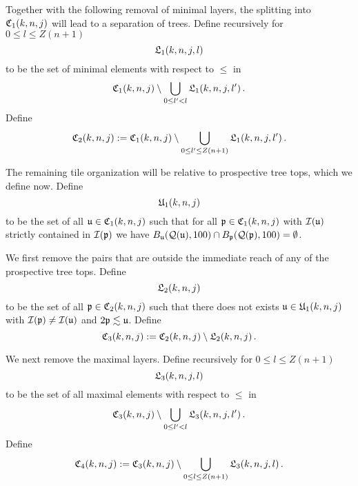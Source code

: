 {\begin{equation}
\end{equation}
Together with the following removal of minimal layers, the splitting into $\mathfrak C_1(k,n,j)$ will lead to a separation of  trees.
Define recursively for $0\le l\le Z(n+1)$
\begin{equation}
    \label{eq L1 def}
    \mathfrak L_1(k,n,j,l)
\end{equation}
to be the set of minimal elements with respect to $\le$ in
\begin{equation}
    \mathfrak C_1(k,n,j)\setminus \bigcup_{0\le l'<l}
\mathfrak L_1(k,n,j,l')\, .
\end{equation}
Define
\begin{equation}
    \label{eq C2 def}
    \mathfrak C_2(k,n,j):= \mathfrak C_1(k,n,j)\setminus \bigcup_{0\le l'\le Z(n+1)}
\mathfrak L_1(k,n,j,l')\, .
\end{equation}

The remaining tile organization will be relative to
prospective tree tops, which we define now.
Define
\begin{equation}\label{defunkj}
     \mathfrak U_1(k,n,j)
\end{equation}
to be the set of all
$\mathfrak u \in \mathfrak C_1(k,n,j)$ such that
for all $\mathfrak p \in \mathfrak C_1(k,n,j)$
with  $\mathcal{I}(\mathfrak u)$ strictly contained in
$\mathcal{I}(\mathfrak p)$ we have $B_{\mathfrak u}(\mathcal{Q}(\mathfrak u), 100) \cap B_{\mathfrak p}(\mathcal{Q}(\mathfrak p),100) = \emptyset$.

We first remove the pairs that are outside the immediate reach of any of the prospective tree tops.
Define
\begin{equation}
\label{eq L2 def}
\mathfrak L_2(k,n,j)
\end{equation}
to be the set of all $\mathfrak p\in \mathfrak C_2(k,n,j)$ such that there
does not exists
$\mathfrak u\in \mathfrak U_1(k,n,j)$
with $\mathcal{I}(\mathfrak p)\neq \mathcal{I}(\mathfrak u)$ and $2\mathfrak p\lesssim \mathfrak u$.
Define
\begin{equation}
\label{eq C3 def}
\mathfrak C_3(k,n,j):=\mathfrak C_2(k,n,j)
  \setminus \mathfrak L_2(k,n,j)\, .
\end{equation}


We next remove the maximal layers.
Define recursively for $0 \le l \le Z(n+1)$
\begin{equation}
    \label{eq L3 def}
    \mathfrak L_3(k,n,j,l)
\end{equation}
to be the set of all maximal elements with respect to $\le$ in
\begin{equation}
    \mathfrak C_3(k,n,j) \setminus \bigcup_{0 \le l' < l} \mathfrak L_3(k,n,j,l')\,.
\end{equation}
Define
\begin{equation}
\label{eq C4 def}
\mathfrak C_4(k,n,j):=\mathfrak C_3(k,n,j)
  \setminus \bigcup_{0 \le l \le Z(n+1)} \mathfrak L_3(k,n,j,l)\,.
\end{equation}

}
